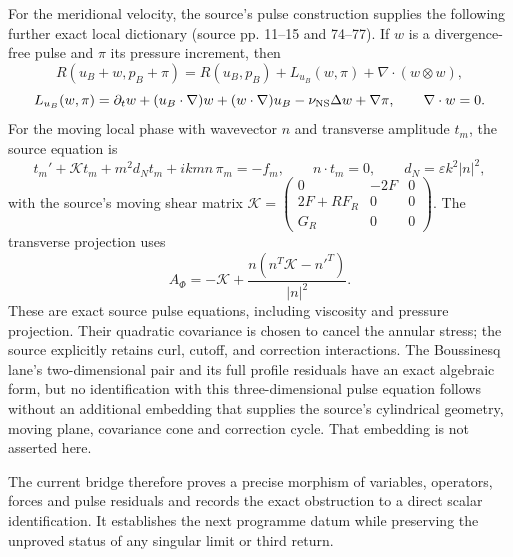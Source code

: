 \documentclass[11pt]{article}
\begin{document}
For the meridional velocity, the source's pulse construction supplies the
following further exact local dictionary (source pp. 11--15 and 74--77). If
$w$ is a divergence-free pulse and $\pi$ its pressure increment, then
\[
 R(u_B+w,p_B+\pi)=R(u_B,p_B)+L_{u_B}(w,\pi)
 +\nabla\!\cdot(w\otimes w),
\]
\[
 L_{u_B}(w,\pi)=\partial_tw+(u_B\cdot\nabla)w
 +(w\cdot\nabla)u_B-\nu_{\rm NS}\Delta w+\nabla\pi,
 \qquad \nabla\cdot w=0.
\]
For the moving local phase with wavevector $n$ and transverse amplitude
$t_m$, the source equation is
\[
 t_m'+\mathcal Kt_m+m^2d_N t_m+i k m n\,\pi_m=-f_m,
 \qquad n\cdot t_m=0,
 \qquad d_N=\varepsilon k^2|n|^2,
\]
with the source's moving shear matrix
$\mathcal K=\begin{pmatrix}0&-2F&0\\2F+RF_R&0&0\\G_R&0&0\end{pmatrix}$.
The transverse projection uses
\[
 A_\Phi=-\mathcal K+
 \frac{n(n^T\mathcal K-n'^T)}{|n|^2}.
\]
These are exact source pulse equations, including viscosity and pressure
projection. Their quadratic covariance is chosen to cancel the annular
stress; the source explicitly retains curl, cutoff, and correction interactions.
The Boussinesq lane's two-dimensional pair and its full profile residuals have
an exact algebraic form, but no identification with this three-dimensional
pulse equation follows without an additional embedding that supplies the
source's cylindrical geometry, moving plane, covariance cone and correction
cycle. That embedding is not asserted here.

The current bridge therefore proves a precise morphism of variables, operators,
forces and pulse residuals and records the exact obstruction to a direct scalar
identification. It establishes the next programme datum while preserving the
unproved status of any singular limit or third return.


\sloppy
\end{document}
